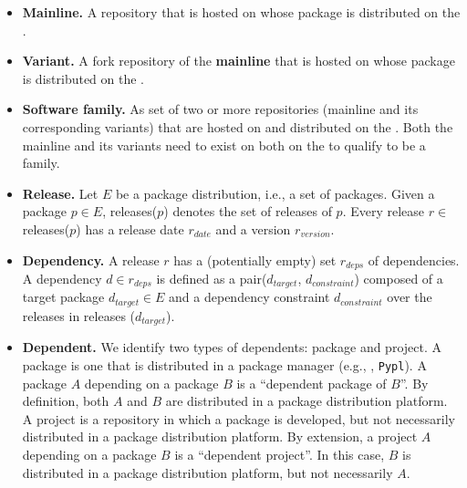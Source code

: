 \begin{itemize}
    \item \textbf{Mainline.} A repository that is hosted on \scp whose package is distributed on the \npm.

    \item \textbf{Variant.} A fork repository of the \textbf{mainline} that is hosted on \scp whose package is distributed on the \npm.

    \item \textbf{Software family.} As set of two or more repositories (mainline and its corresponding variants) that are hosted on \scp and distributed on the \npm. Both the mainline and its variants need to exist on both on the \npm to qualify to be a family.

    \item \textbf{Release.} Let $E$ be a package distribution, i.e., a set of packages. Given a package $p\in E$, releases($p$) denotes the set of releases of $p$. Every release $r\in$ releases($p$) has a release date $r_{date}$ and a version $r_{version}$.

     \item \textbf{Dependency.} A release $r$ has a (potentially empty) set $r_{deps}$ of dependencies. A dependency $d \in r_{deps}$ is defined as a pair($d_{target}$, $d_{constraint}$) composed of a target package $d_{target} \in E$ and a dependency constraint $d_{constraint}$ over the releases in releases ($d_{target}$).

    \item \textbf{Dependent.} We identify two types of dependents: package and project. A package is one that is distributed in a package manager (e.g., \np, \texttt{Pypl}). A package $A$ depending on a package $B$ is a ``dependent package of $B$''. By definition, both $A$ and $B$ are distributed in a package distribution platform. A project is a repository in which a package is developed, but not necessarily distributed in a package distribution platform. By extension, a project $A$ depending on a package $B$ is a ``dependent project''. In this case, $B$ is distributed in a package distribution platform, but not necessarily $A$.

\end{itemize}

